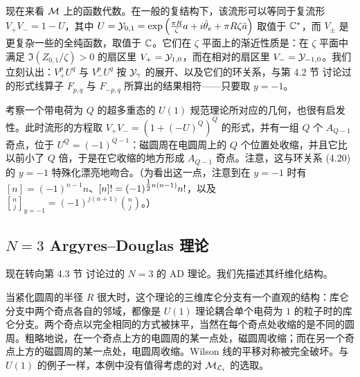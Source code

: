 现在来看 $\mathcal{M}$ 上的函数代数。在一般的复结构下，该流形可以等同于复流形 $V_+V_-=1-U$，其中 $U=\mathcal{Y}_{0,1}=\exp\left(\frac{\pi R}{\zeta}a+i\tilde\theta_e+\pi R\zeta\bar a\right)$ 取值于 $\mathbb{C}^*$，而 $V_\pm$ 是更复杂一些的全纯函数，取值于 $\mathbb{C}$。它们在 $\zeta$ 平面上的渐近性质是：在 $\zeta$ 平面中满足 $\Im(Z_{0,1}/\zeta)>0$ 的扇区里 $V_+=\mathcal{Y}_{1,0}$，而在相对的扇区里 $V_-=\mathcal{Y}_{-1,0}$。我们立刻认出：$V_+^pU^q$ 与 $V_-^pU^q$ 按 $\mathcal{Y}_\gamma$ 的展开、以及它们的环关系，与第 4.2 节%
讨论过的形式线算子 $F_{p,q}$ 与 $F_{-p,q}$ 所算出的结果相符——只要取 $y=-1$。

考察一个带电荷为 $Q$ 的超多重态的 $U(1)$ 规范理论所对应的几何，也很有启发性。此时流形的方程取 $V_+V_-=(1+(-U)^Q)^Q$ 的形式，并有一组 $Q$ 个 $A_{Q-1}$ 奇点，位于 $U^Q=(-1)^{Q-1}$：磁圆周在电圆周上的 $Q$ 个位置处收缩，并且它比以前小了 $Q$ 倍，于是在它收缩的地方形成 $A_{Q-1}$ 奇点。注意，这与环关系 (4.20)%
的 $y=-1$ 特殊化漂亮地吻合。（为看出这一点，注意到在 $y=-1$ 时有 $[n]=(-1)^{n-1}n$、$[n]! =(-1)^{\tfrac{1}{2} n(n-1)}n!$，以及 $\genfrac{[}{]}{0pt}{}{n}{j}_{y=-1}=(-1)^{j(n+1)}\binom{n}{j}$。）

\subsection{$N=3$ Argyres--Douglas 理论}\label{subsec:N3-AD-Manfld}

现在转向第 4.3 节%
讨论过的 $N=3$ 的 AD 理论。我们先描述其纤维化结构。

当紧化圆周的半径 $R$ 很大时，这个理论的三维库仑分支有一个直观的结构：库仑分支中两个奇点各自的邻域，都像是 $U(1)$ 理论耦合单个电荷为 $1$ 的粒子时的库仑分支。两个奇点以完全相同的方式被抹平，当然在每个奇点处收缩的是不同的圆周。粗略地说，在一个奇点上方的电圆周的某一点处，磁圆周收缩；而在另一个奇点上方的磁圆周的某一点处，电圆周收缩。Wilson 线的平移对称被完全破坏。与 $U(1)$ 的例子一样，本例中没有值得考虑的对 $\mathcal{M}_{\mathcal{L}_i}$ 的选取。

